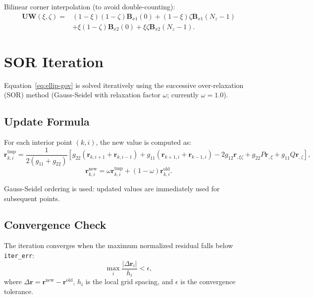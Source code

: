 \documentclass[11pt,a4paper]{report}
\newcommand{\rvec}{\bm{r}}
\begin{document}
Bilinear corner interpolation (to avoid double-counting):
\begin{equation}
\begin{split}
    \bm{UW}(\xi, \zeta) = & (1-\xi)(1-\zeta)\bm{B}_{x1}(0) + (1-\xi)\zeta\bm{B}_{x1}(N_z-1) \\
    & + \xi(1-\zeta)\bm{B}_{x2}(0) + \xi\zeta\bm{B}_{x2}(N_z-1).
\end{split}
\end{equation}

\section{SOR Iteration}

Equation~\eqref{eq:ellip-gov} is solved iteratively using the successive over-relaxation (SOR) method (Gauss-Seidel with relaxation factor $\omega$; currently $\omega = 1.0$).

\subsection{Update Formula}

For each interior point $(k, i)$, the new value is computed as:
\begin{equation}
    \rvec_{k,i}^{\text{tmp}} = \frac{1}{2(g_{11} + g_{22})} \left[ g_{22}(\rvec_{k,i+1} + \rvec_{k,i-1}) + g_{11}(\rvec_{k+1,i} + \rvec_{k-1,i}) - 2g_{12} \rvec_{,\xi\zeta} + g_{22} P \rvec_{,\xi} + g_{11} Q \rvec_{,\zeta} \right],
\end{equation}
\begin{equation}
    \rvec_{k,i}^{\text{new}} = \omega \rvec_{k,i}^{\text{tmp}} + (1-\omega) \rvec_{k,i}^{\text{old}}.
\end{equation}

Gauss-Seidel ordering is used: updated values are immediately used for subsequent points.

\subsection{Convergence Check}

The iteration converges when the maximum normalized residual falls below \texttt{iter\_err}:
\begin{equation}
    \max_i \frac{|\Delta \rvec_i|}{h_i} < \epsilon,
\end{equation}
where $\Delta \rvec = \rvec^{\text{new}} - \rvec^{\text{old}}$, $h_i$ is the local grid spacing, and $\epsilon$ is the convergence tolerance.
\end{document}
